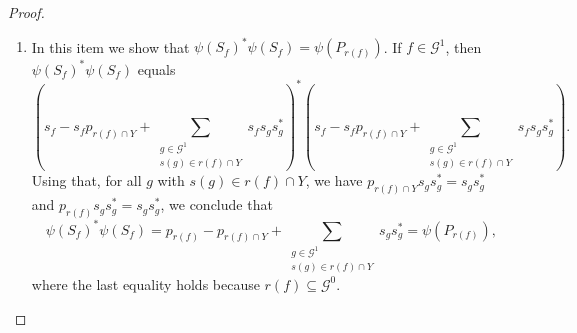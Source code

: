 \documentclass[12pt, reqno]{amsart}
\theoremstyle{definition}
\theoremstyle{remark}
\numberwithin{equation}{section}
\begin{document}
\begin{proof}
\begin{enumerate}
Of course $\psi(P_{\emptyset}) = p_{\emptyset} = 0$. Let us now prove that
$\psi(P_{Z_1 \cap Z_2}) = \psi(P_{Z_1}) \psi(P_{Z_2})$ for all $Z_1, Z_2 \in \mathcal{E}_X^0$.
Write
\[
Z_1 = A_1 \cup (B_1 \cap Y)'
\quad\text{and}\quad
Z_2 = A_2 \cup (B_2 \cap Y)'
\]
as in Corollary~\ref{decomposition2}. Note that $\psi(P_{Z_1}) \psi(P_{Z_2})$ is the product of
\[
\left(
p_{A_1} - p_{A_1 \cap Y}
+ \sum_{\substack{e \in \mathcal{G}^1 \\ s(e) \in A_1 \cap Y}} s_e s_e^*
+ \sum_{\substack{w \in \mathcal{G}^0 \\ w \in B_1 \cap Y}} q_w
\right)
\]
and
\[
\left(
p_{A_2} - p_{A_2 \cap Y}
+ \sum_{\substack{e \in \mathcal{G}^1 \\ s(e) \in A_2 \cap Y}} s_e s_e^*
+ \sum_{\substack{w \in \mathcal{G}^0 \\ w \in B_2 \cap Y}} q_w
\right).
\]
Using the equalities provided in Lemma~\ref{contas1}, most of the products are $0$ or cancel with
another term, so that
\[
\psi(P_{Z_1})\psi(P_{Z_2})
=
p_{A_1 \cap A_2}
-
p_{A_1 \cap A_2 \cap Y}
+
\sum_{\substack{e \in \mathcal{G}^1 \\ s(e) \in A_1 \cap A_2 \cap Y}} s_e s_e^*
+
\sum_{w \in B_1 \cap B_2 \cap Y} q_w.
\]
Thus we have the desired result; indeed, the right-hand side is exactly the definition of
$\psi(P_{Z_1 \cap Z_2})$, because
$Z_1 \cap Z_2 = (A_1 \cap A_2) \cup (B_1 \cap B_2 \cap Y)'$.

To finalize item~(1), we still need to show that
$\psi(P_{Z_1}) + \psi(P_{Z_2}) - \psi(P_{Z_1 \cap Z_2}) = \psi(P_{Z_1 \cup Z_2})$.
This is similar to what we did above, and we leave it to the interested reader.

\item In this item we show that $\psi(S_f)^*\psi(S_f) = \psi(P_{r(f)})$. If $f \in \mathcal{G}^1$,
then $\psi(S_f)^* \psi(S_f)$ equals
\[
\left(
s_f - s_f p_{r(f) \cap Y}
+ \sum_{\substack{g \in \mathcal{G}^1 \\ s(g) \in r(f) \cap Y}} s_f s_g s_g^*
\right)^{\!*}
\left(
s_f - s_f p_{r(f) \cap Y}
+ \sum_{\substack{g \in \mathcal{G}^1 \\ s(g) \in r(f) \cap Y}} s_f s_g s_g^*
\right).
\]
Using that, for all $g$ with $s(g) \in r(f) \cap Y$, we have
$p_{r(f) \cap Y}s_g s_g^* = s_g s_g^*$ and $p_{r(f)}s_g s_g^* = s_g s_g^*$, we conclude that
\[
\psi(S_f)^* \psi(S_f)
=
p_{r(f)} - p_{r(f) \cap Y}
+ \sum_{\substack{g \in \mathcal{G}^1 \\ s(g) \in r(f) \cap Y}} s_g s_g^*
=
\psi(P_{r(f)}),
\]
where the last equality holds because $r(f) \subseteq \mathcal{G}^0$.


\end{enumerate}
\end{proof}
\end{document}
